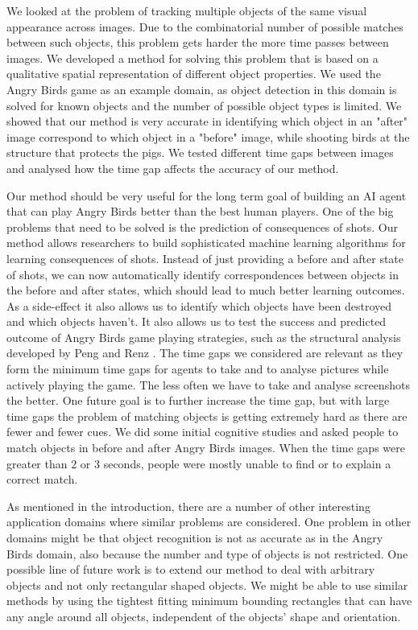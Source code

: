 \documentclass[letterpaper]{article}
\begin{document}
We looked at the problem of tracking multiple objects of the same visual appearance across images. Due to the combinatorial number of possible matches between such objects, this problem gets harder the more time passes between images. We developed a method for solving this problem that is based on a qualitative spatial representation of different object properties. We used the Angry Birds game as an example domain, as object detection in this domain is solved for known objects and the number of possible object types is limited. We showed that our method is very accurate in identifying which object in an "after" image correspond to which object in a "before" image, while shooting birds at the structure that protects the pigs. We tested different time gaps between images and analysed how the time gap affects the accuracy of our method. 

Our method should be very useful for the long term goal of building an AI agent that can play Angry Birds better than the best human players. One of the big problems that need to be solved is the prediction of consequences of shots. Our method allows researchers to build sophisticated machine learning algorithms for learning consequences of shots. Instead of just providing a before and after state of shots, we can now automatically identify correspondences between objects in the before and after states, which should lead to much better learning outcomes. As a side-effect it also allows us to identify which objects have been destroyed and which objects haven't. 
It also allows us to test the success and predicted outcome of Angry Birds game playing strategies, such as the structural analysis developed by Peng and Renz \cite{peng13}. 
The time gaps we considered are relevant as they form the minimum time gaps for agents to take and to analyse pictures while actively playing the game. The less often we have to take and analyse screenshots the better. One future goal is to further increase the time gap, but with large time gaps the problem of matching objects is getting extremely hard as there are fewer and fewer cues. We did some initial cognitive studies and asked people to match objects in before and after Angry Birds images. When the time gaps were greater than 2 or 3 seconds, people were mostly unable to find or to explain a correct match. 

As mentioned in the introduction, there are a number of other interesting application domains where similar problems are considered. One problem in other domains might be that object recognition is not as accurate as in the Angry Birds domain, also because the number and type of objects is not restricted. 
One possible line of future work is to extend our method to deal with arbitrary objects and not only rectangular shaped objects. We might be able to use similar methods by using the tightest fitting minimum bounding rectangles that can have any angle around all objects, independent of the objects' shape and orientation.   
\end{document}
